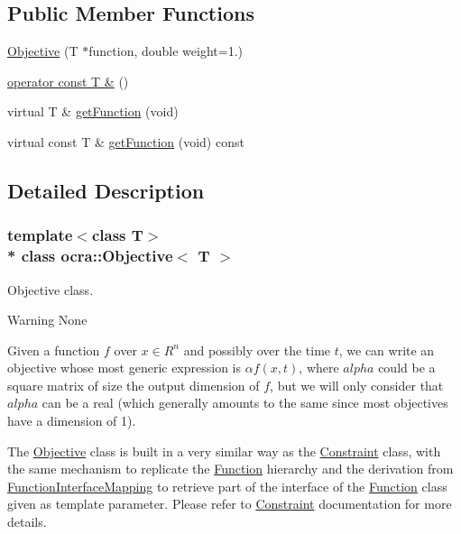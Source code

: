 \subsection*{Public Member Functions}
\begin{DoxyCompactItemize}
\item 
\hyperlink{classocra_1_1Objective_a8ece61f7359bcc67cc5a10fde1ddd11d}{Objective} (T $\ast$function, double weight=1.)
\item 
\hyperlink{classocra_1_1Objective_adde3288cc5ad20394a3558c9b8092b71}{operator const T \&} ()
\end{DoxyCompactItemize}
{\bf }\par
\begin{DoxyCompactItemize}
\item 
virtual T \& \hyperlink{classocra_1_1Objective_acefbb478e0d9ae080ead812eea70e22e}{get\+Function} (void)
\item 
virtual const T \& \hyperlink{classocra_1_1Objective_a0d7d09b470e680b0298beb923a65f35b}{get\+Function} (void) const 
\end{DoxyCompactItemize}



\subsection{Detailed Description}
\subsubsection*{template$<$class T$>$\\*
class ocra\+::\+Objective$<$ T $>$}

Objective class. 

\begin{DoxyWarning}{Warning}
None
\end{DoxyWarning}
Given a function $ f $ over $ x \in R^n $ and possibly over the time $ t $, we can write an objective whose most generic expression is $ \alpha f(x,t) $, where $ alpha $ could be a square matrix of size the output dimension of $ f $, but we will only consider that $ alpha $ can be a real (which generally amounts to the same since most objectives have a dimension of 1).

The \hyperlink{classocra_1_1Objective}{Objective} class is built in a very similar way as the \hyperlink{classocra_1_1Constraint}{Constraint} class, with the same mechanism to replicate the \hyperlink{classocra_1_1Function}{Function} hierarchy and the derivation from \hyperlink{structocra_1_1FunctionInterfaceMapping}{Function\+Interface\+Mapping} to retrieve part of the interface of the \hyperlink{classocra_1_1Function}{Function} class given as template parameter. Please refer to \hyperlink{classocra_1_1Constraint}{Constraint} documentation for more details.

